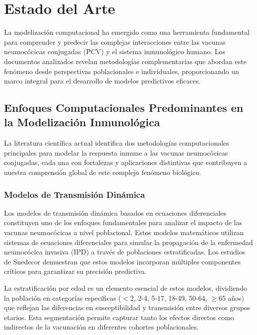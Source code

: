  
\chapter{Estado del Arte}\label{chapter:estadoarte}

La modelización computacional ha emergido como una herramienta fundamental para comprender y predecir las complejas interacciones entre las vacunas neumocócicas conjugadas (PCV) y el sistema inmunológico humano. Los documentos analizados revelan metodologías complementarias que abordan este fenómeno desde perspectivas poblacionales e individuales, proporcionando un marco integral para el desarrollo de modelos predictivos eficaces.

\section{Enfoques Computacionales Predominantes en la Modelización Inmunológica}

La literatura científica actual identifica dos metodologías computacionales principales para modelar la respuesta inmune a las vacunas neumocócicas conjugadas, cada una con fortalezas y aplicaciones distintivas que contribuyen a nuestra comprensión global de este complejo fenómeno biológico.

\subsection{Modelos de Transmisión Dinámica}

Los modelos de transmisión dinámica basados en ecuaciones diferenciales constituyen uno de los enfoques fundamentales para analizar el impacto de las vacunas neumocócicas a nivel poblacional. Estos modelos matemáticos utilizan sistemas de ecuaciones diferenciales para simular la propagación de la enfermedad neumocócica invasiva (IPD) a través de poblaciones estratificadas. Los estudios de Snedecor \cite{Snedecor2020a,Snedecor2020b} demuestran que estos modelos incorporan múltiples componentes críticos para garantizar su precisión predictiva.

La estratificación por edad es un elemento esencial de estos modelos, dividiendo la población en categorías específicas ($<$2, 2-4, 5-17, 18-49, 50-64, $\geq$65 años) que reflejan las diferencias en susceptibilidad y transmisión entre diversos grupos etarios. Esta segmentación permite capturar tanto los efectos directos como indirectos de la vacunación en diferentes cohortes poblacionales.

